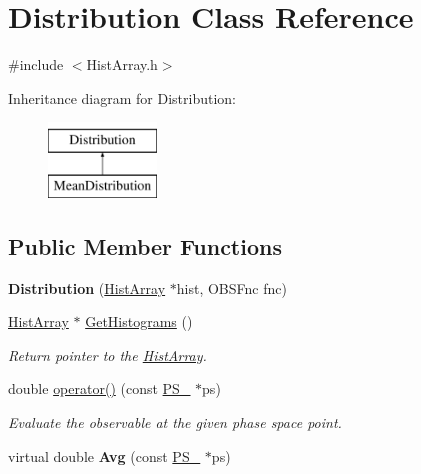 \hypertarget{classDistribution}{}\section{Distribution Class Reference}
\label{classDistribution}


{\ttfamily \#include $<$Hist\+Array.\+h$>$}

Inheritance diagram for Distribution\+:\begin{figure}[H]
\begin{center}
\leavevmode
\includegraphics[height=2.000000cm]{classDistribution}
\end{center}
\end{figure}
\subsection*{Public Member Functions}
\begin{DoxyCompactItemize}
\item 
\hypertarget{classDistribution_aa7269a89c1c603c957891f49af7542e4}{}{\bfseries Distribution} (\hyperlink{classHistArray}{Hist\+Array} $\ast$hist, O\+B\+S\+Fnc fnc)\label{classDistribution_aa7269a89c1c603c957891f49af7542e4}

\item 
\hypertarget{classDistribution_a49dc0f91394f9adf82f8485ba9e12a6c}{}\hyperlink{classHistArray}{Hist\+Array} $\ast$ \hyperlink{classDistribution_a49dc0f91394f9adf82f8485ba9e12a6c}{Get\+Histograms} ()\label{classDistribution_a49dc0f91394f9adf82f8485ba9e12a6c}

\begin{DoxyCompactList}\small\item\em Return pointer to the \hyperlink{classHistArray}{Hist\+Array}. \end{DoxyCompactList}\item 
double \hyperlink{classDistribution_ab5f71f14986ae6fee369e1d3e288f793}{operator()} (const \hyperlink{classPS__2}{P\+S\+\_} $\ast$ps)
\begin{DoxyCompactList}\small\item\em Evaluate the observable at the given phase space point. \end{DoxyCompactList}\item 
\hypertarget{classDistribution_a2ccf70347a37bdb98f60067ee0ac4b87}{}virtual double {\bfseries Avg} (const \hyperlink{classPS__2}{P\+S\+\_} $\ast$ps)\label{classDistribution_a2ccf70347a37bdb98f60067ee0ac4b87}

\end{DoxyCompactItemize}


